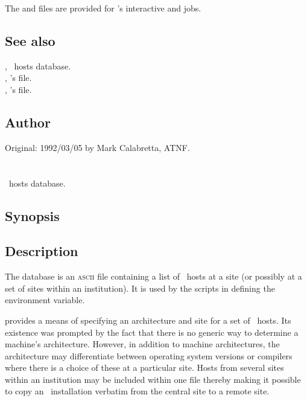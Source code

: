 \noindent
The  and  files are provided for
's interactive and  jobs.

\subsection*{See also}

, \aipspp\ hosts database.\\
, 's  file.\\
, 's  file.

\subsection*{Author}

Original: 1992/03/05 by Mark Calabretta, ATNF.


\newpage
\section{}
\label{aipshosts}

\aipspp\ hosts database.

\subsection*{Synopsis}

\begin{synopsis}
\end{synopsis}

\subsection*{Description}

The  database is an \textsc{ascii} file containing a list of
\aipspp\ hosts at a site (or possibly at a set of sites within an
institution).  It is used by the  scripts in
defining the  environment variable.

 provides a means of specifying an architecture and site for a
set of \aipspp\ hosts.  Its existence was prompted by the fact that there is
no generic way to determine a machine's architecture.  However, in addition to
machine architectures, the architecture may differentiate between operating
system versions or compilers where there is a choice of these at a particular
site.  Hosts from several sites within an institution may be included within
one  file thereby making it possible to copy an \aipspp\ 
installation verbatim from the central site to a remote site.


